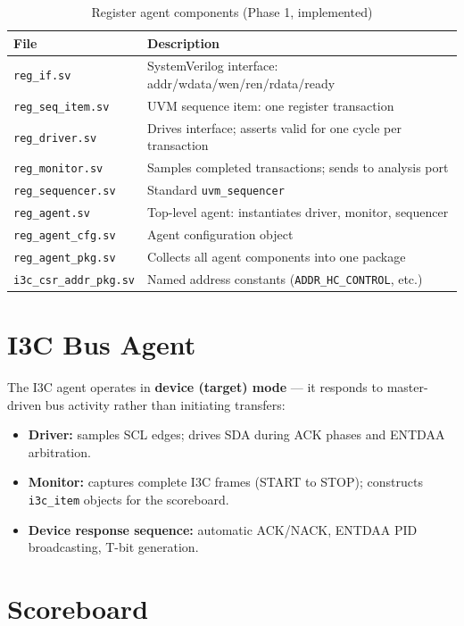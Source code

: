 \documentclass[12pt, a4paper, oneside]{report}
\newcommand{\file}[1]{\texttt{#1}}
\begin{document}
\begin{table}[H]
\centering
\caption{Register agent components (Phase 1, implemented)}
\label{tab:reg_agent}
\begin{tabularx}{\textwidth}{L{4.5cm} L{8.5cm}}
\toprule
\textbf{File} & \textbf{Description} \\
\midrule
\file{reg\_if.sv}           & SystemVerilog interface: addr/wdata/wen/ren/rdata/ready \\
\file{reg\_seq\_item.sv}    & UVM sequence item: one register transaction \\
\file{reg\_driver.sv}       & Drives interface; asserts valid for one cycle per transaction \\
\file{reg\_monitor.sv}      & Samples completed transactions; sends to analysis port \\
\file{reg\_sequencer.sv}    & Standard \texttt{uvm\_sequencer} \\
\file{reg\_agent.sv}        & Top-level agent: instantiates driver, monitor, sequencer \\
\file{reg\_agent\_cfg.sv}   & Agent configuration object \\
\file{reg\_agent\_pkg.sv}   & Collects all agent components into one package \\
\file{i3c\_csr\_addr\_pkg.sv} & Named address constants (\texttt{ADDR\_HC\_CONTROL}, etc.) \\
\bottomrule
\end{tabularx}
\end{table}

\section{I3C Bus Agent}

The I3C agent operates in \textbf{device (target) mode} --- it responds to
master-driven bus activity rather than initiating transfers:
\begin{itemize}
  \item \textbf{Driver:} samples SCL edges; drives SDA during ACK phases and
        ENTDAA arbitration.
  \item \textbf{Monitor:} captures complete I3C frames (START to STOP); constructs
        \texttt{i3c\_item} objects for the scoreboard.
  \item \textbf{Device response sequence:} automatic ACK/NACK, ENTDAA PID
        broadcasting, T-bit generation.
\end{itemize}

\section{Scoreboard}
\end{document}
